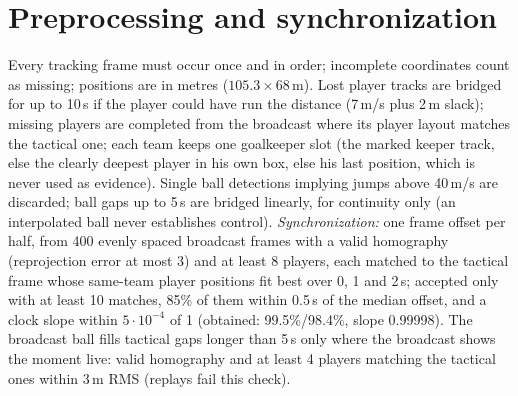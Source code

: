 \documentclass[10pt,a4paper]{article}
\begin{document}
\section{Preprocessing and synchronization}
Every tracking frame must occur once and in order; incomplete coordinates count as missing; positions are in metres
($105.3\times68$\,m). Lost player tracks are bridged for up to 10\,s if the player could have run the distance (7\,m/s plus 2\,m
slack); missing players are completed from the broadcast where its player layout matches the tactical one; each team keeps one
goalkeeper slot (the marked keeper track, else the clearly deepest player in his own box, else his last position, which is never
used as evidence). Single ball detections implying jumps above 40\,m/s are discarded; ball gaps up to 5\,s are bridged linearly,
for continuity only (an interpolated ball never establishes control). \emph{Synchronization:} one frame offset per half, from
400 evenly spaced broadcast frames with a valid homography (reprojection error at most 3) and at least 8 players, each matched to
the tactical frame whose same-team player positions fit best over 0, 1 and 2\,s; accepted only with at least 10 matches, 85\% of
them within 0.5\,s of the median offset, and a clock slope within $5\cdot10^{-4}$ of 1 (obtained: 99.5\%/98.4\%, slope 0.99998).
The broadcast ball fills tactical gaps longer than 5\,s only where the broadcast shows the moment live: valid homography and at
least 4 players matching the tactical ones within 3\,m RMS (replays fail this check).
\end{document}
